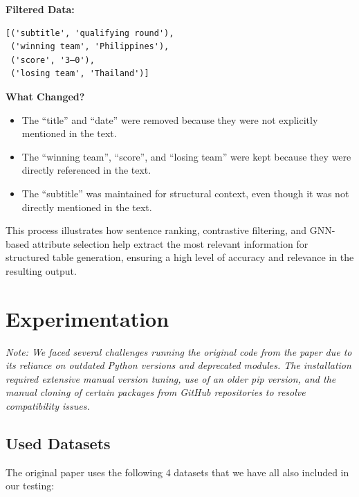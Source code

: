 \documentclass[12pt,a4paper]{article}
\begin{document}
\textbf{Filtered Data:}
\begin{verbatim}
[('subtitle', 'qualifying round'), 
 ('winning team', 'Philippines'), 
 ('score', '3–0'), 
 ('losing team', 'Thailand')]
\end{verbatim}

\textbf{What Changed?}
\begin{itemize}
    \item The ``title'' and ``date'' were removed because they were not explicitly mentioned in the text.
    \item The ``winning team'', ``score'', and ``losing team'' were kept because they were directly referenced in the text.
    \item The ``subtitle'' was maintained for structural context, even though it was not directly mentioned in the text.
\end{itemize}

This process illustrates how sentence ranking, contrastive filtering, and GNN-based attribute selection help extract the most relevant information for structured table generation, ensuring a high level of accuracy and relevance in the resulting output.

\section*{Experimentation}
\textit{Note: We faced several challenges running the original code from the paper due to its reliance on outdated Python versions and deprecated modules. The installation required extensive manual version tuning, use of an older pip version, and the manual cloning of certain packages from GitHub repositories to resolve compatibility issues. }
\ \\
\subsection*{Used Datasets}
The original paper uses the following 4 datasets that we have all also included in our testing:
\end{document}
